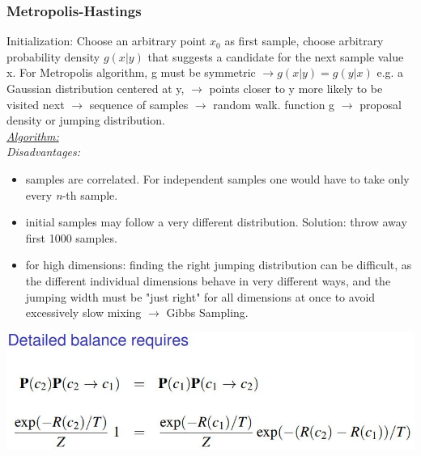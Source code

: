 \documentclass[9pt,parskip]{scrartcl}
\begin{document}
\begin{multicols*}{4}
\subsubsection*{Metropolis-Hastings}
Initialization: Choose an arbitrary point $x_0$ as first sample, choose arbitrary probability density $g(x|y)$ that suggests a candidate for the next sample value x. For Metropolis algorithm, g must be symmetric $\to g(x|y)=g(y|x)$ e.g. a Gaussian distribution centered at y, $\to$ points closer to y more likely to be visited next $\to$ sequence of samples $\to$ random walk. function g $\to$ proposal density or jumping distribution. \\
\underline{\textit{Algorithm: }} \\
\textit{Disadvantages:}
\begin{itemize}
	\item samples are correlated. For independent samples one would have to take only every \textit{n}-th sample.
	\item initial samples may follow a very different distribution. Solution: throw away first 1000 samples.
	\item  for high dimensions: finding the right jumping distribution can be difficult, as the different individual dimensions behave in very different ways, and the jumping width must be "just right" for all dimensions at once to avoid excessively slow mixing $\to$ Gibbs Sampling.
\end{itemize}
\includegraphics[width=0.7\linewidth]{pictures/detailedBalance.jpg}


\end{multicols*}
\end{document}
